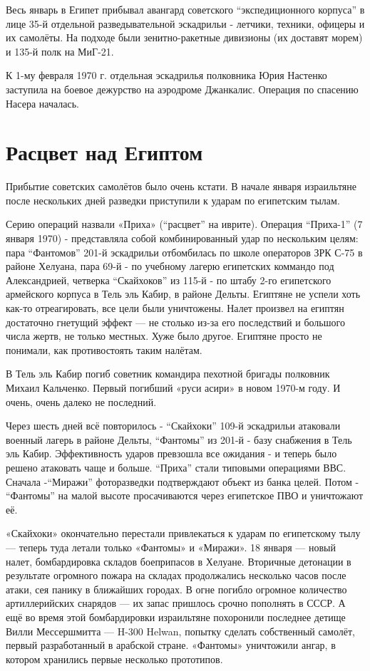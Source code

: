 Весь январь в Египет прибывал авангард советского “экспедиционного корпуса” в лице 35-й отдельной разведывательной эскадрильи - летчики, техники, офицеры и их самолёты. На подходе были зенитно-ракетные дивизионы (их доставят морем) и 135-й полк на МиГ-21.

К 1-му февраля 1970 г. отдельная эскадрилья полковника Юрия Настенко заступила на боевое дежурство на аэродроме Джанкалис. Операция по спасению Насера началась.

\section{Расцвет над Египтом}

Прибытие советских самолётов было очень кстати. В начале января израильтяне после нескольких дней разведки приступили к ударам по египетским тылам.

Серию операций назвали «Приха» (“расцвет” на иврите). Операция “Приха-1” (7 января 1970) - представляла собой комбинированный удар по нескольким целям: пара “Фантомов” 201-й эскадрильи отбомбилась по школе операторов ЗРК С-75 в районе Хелуана, пара 69-й - по учебному лагерю египетских коммандо под Александрией, четверка “Скайхоков” из 115-й - по штабу 2-го египетского армейского корпуса в Тель эль Кабир, в районе Дельты. Египтяне не успели хоть как-то отреагировать, все цели были уничтожены. Налет произвел на египтян достаточно гнетущий эффект — не столько из-за его последствий и большого числа жертв, не только местных. Хуже было другое. Египтяне просто не понимали, как противостоять таким налётам.

В Тель эль Кабир погиб советник командира пехотной бригады полковник Михаил Кальченко. Первый погибший «руси асири» в новом 1970-м году. И очень, очень далеко не последний.

Через шесть дней всё повторилось - “Скайхоки” 109-й эскадрильи атаковали военный лагерь в районе Дельты, “Фантомы” из 201-й - базу снабжения в Тель эль Кабир. Эффективность ударов превзошла все ожидания - и теперь было решено атаковать чаще и больше. “Приха” стали типовыми операциями ВВС. Сначала -“Миражи” фоторазведки подтверждают объект из банка целей. Потом - “Фантомы” на малой высоте просачиваются через египетское ПВО и уничтожают её.

«Скайхоки» окончательно перестали привлекаться к ударам по египетскому тылу — теперь туда летали только «Фантомы» и «Миражи». 18 января — новый налет, бомбардировка складов боеприпасов в Хелуане. Вторичные детонации в результате огромного пожара на складах продолжались несколько часов после атаки, сея панику в ближайших городах. В огне погибло огромное количество артиллерийских снарядов — их запас пришлось срочно пополнять в СССР. А ещё во время этой бомбардировки израильтяне похоронили последнее детище Вилли Мессершмитта — H-300 Helwan, попытку сделать собственный самолёт, первый разработанный в арабской стране. «Фантомы» уничтожили ангар, в котором хранились первые несколько прототипов.

